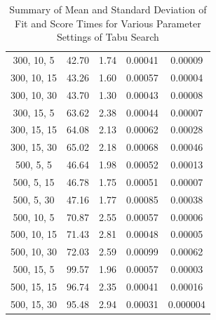 \documentclass[
]{article}
\begin{document}
\begin{table}[H]
{\begin{tabular}{|c|c|c|c|c|}
                300, 10, 5                 & 42.70                  & 1.74                  & 0.00041                  & 0.00009                 \\
                300, 10, 15                & 43.26                  & 1.60                  & 0.00057                  & 0.00004                 \\
                300, 10, 30                & 43.70                  & 1.30                  & 0.00043                  & 0.00008                 \\
                300, 15, 5                 & 63.62                  & 2.38                  & 0.00044                  & 0.00007                 \\
                300, 15, 15                & 64.08                  & 2.13                  & 0.00062                  & 0.00028                 \\
                300, 15, 30                & 65.02                  & 2.18                  & 0.00068                  & 0.00046                 \\
                500, 5, 5                  & 46.64                  & 1.98                  & 0.00052                  & 0.00013                 \\
                500, 5, 15                 & 46.78                  & 1.75                  & 0.00051                  & 0.00007                 \\
                500, 5, 30                 & 47.16                  & 1.77                  & 0.00085                  & 0.00038                 \\
                500, 10, 5                 & 70.87                  & 2.55                  & 0.00057                  & 0.00006                 \\
                500, 10, 15                & 71.43                  & 2.81                  & 0.00048                  & 0.00005                 \\
                500, 10, 30                & 72.03                  & 2.59                  & 0.00099                  & 0.00062                 \\
                500, 15, 5                 & 99.57                  & 1.96                  & 0.00057                  & 0.00003                 \\
                500, 15, 15                & 96.74                  & 2.35                  & 0.00041                  & 0.00016                 \\
                500, 15, 30                & 95.48                  & 2.94                  & 0.00031                  & 0.000004                \\
                \hline
            \end{tabular}
        }
        \caption{Summary of Mean and Standard Deviation of Fit and Score Times for Various Parameter Settings of Tabu Search}
        \label{tab:ts_summary_fit_score_times}
    \end{table}
\end{document}
